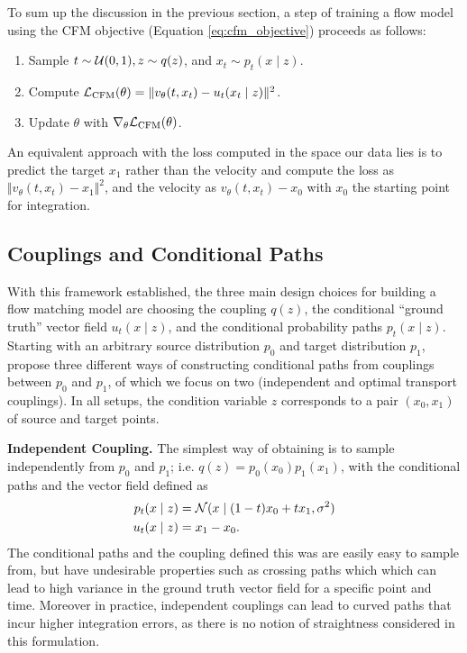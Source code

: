 To sum up the discussion in the previous section, a step of training a flow model using the CFM objective (Equation \ref{eq:cfm_objective}) proceeds as follows:
\begin{enumerate}
    \item Sample $t \sim \mathcal{U}(0,1), z \sim q(z)$, and $x_t \sim p_t(x \mid z)$.
    \item Compute $\mathcal{L}_{\text{CFM}}(\theta) = \Vert v_\theta(t, x_t) - u_t(x_t \mid z) \Vert ^2$.
    \item Update $\theta$ with $\nabla_\theta \mathcal{L}_{\text{CFM}}(\theta)$.
\end{enumerate}
An equivalent approach with the loss computed in the space our data lies is to predict the target $x_1$ rather than the velocity and compute the loss as $\Vert v_\theta(t,x_t) - x_1 \Vert^2$, and the velocity as $v_\theta(t, x_t) - x_0$ with $x_0$ the starting point for integration. 

\subsection{Couplings and Conditional Paths} \label{section:design_choices}

With this framework established, the three main design choices for building a flow matching model are choosing the coupling $q(z)$, the conditional ``ground truth'' vector field $u_t(x \mid z)$, and the conditional probability paths $p_t(x \mid z)$. Starting with an arbitrary source distribution $p_0$ and target distribution $p_1$, \citet{tongImprovingGeneralizingFlowbased2023} propose three different ways of constructing conditional paths from couplings between $p_0$ and $p_1$, of which we focus on two (independent and optimal transport couplings). In all setups, the condition variable $z$ corresponds to a pair $(x_0, x_1)$ of source and target points. 

\textbf{Independent Coupling.} The simplest way of obtaining is to sample independently from $p_0$ and $p_1$; i.e. $q(z) = p_0(x_0) p_1(x_1)$, with the conditional paths and the vector field defined as 
\begin{align} 
    p_t(x \mid z) &= \mathcal{N}(x \mid (1-t)x_0 + t x_1, \sigma^2) \label{eq:cond_path} \\
    u_t(x \mid z) &= x_1 - x_0. \label{eq:cond_vector_field}
\end{align}
The conditional paths and the coupling defined this was are easily easy to sample from, but have undesirable properties such as crossing paths which which can lead to high variance in the ground truth vector field for a specific point and time. Moreover in practice, independent couplings can lead to curved paths that incur higher integration errors, as there is no notion of straightness considered in this formulation.

